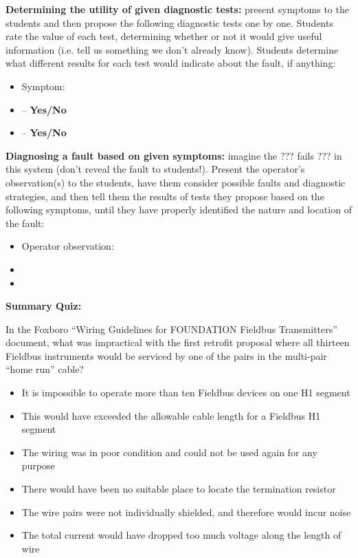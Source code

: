 \vskip 10pt


\noindent
{\bf Determining the utility of given diagnostic tests:} present symptoms to the students and then propose the following diagnostic tests one by one.  Students rate the value of each test, determining whether or not it would give useful information (i.e. tell us something we don't already know).  Students determine what different results for each test would indicate about the fault, if anything:

\begin{itemize}
\item{} Symptom: {\it }
\item{}  -- {\bf Yes/No}
\item{}  -- {\bf Yes/No}
\end{itemize}


\vskip 10pt


\noindent
{\bf Diagnosing a fault based on given symptoms:} imagine the ??? fails ??? in this system (don't reveal the fault to students!).  Present the operator's observation(s) to the students, have them consider possible faults and diagnostic strategies, and then tell them the results of tests they propose based on the following symptoms, until they have properly identified the nature and location of the fault:

\begin{itemize}
\item{} Operator observation: {\it }
\item{} 
\item{} 
\end{itemize}







\vfil \eject

\noindent
{\bf Summary Quiz:}

In the Foxboro ``Wiring Guidelines for FOUNDATION Fieldbus Transmitters'' document, what was impractical with the first retrofit proposal where all thirteen Fieldbus instruments would be serviced by one of the pairs in the multi-pair ``home run'' cable?

\begin{itemize}
\item{} It is impossible to operate more than ten Fieldbus devices on one H1 segment
\vskip 5pt 
\item{} This would have exceeded the allowable cable length for a Fieldbus H1 segment
\vskip 5pt 
\item{} The wiring was in poor condition and could not be used again for any purpose
\vskip 5pt 
\item{} There would have been no suitable place to locate the termination resistor
\vskip 5pt 
\item{} The wire pairs were not individually shielded, and therefore would incur noise
\vskip 5pt 
\item{} The total current would have dropped too much voltage along the length of wire
\end{itemize}





